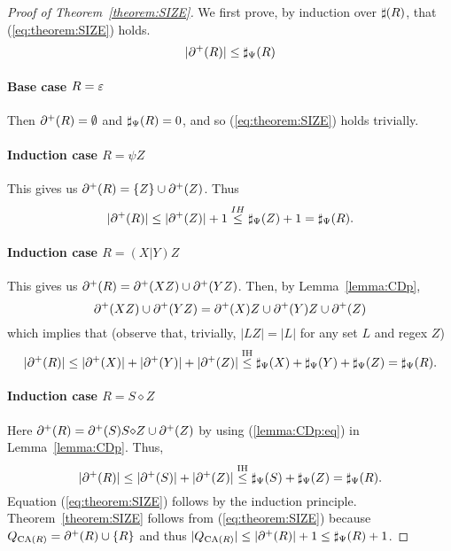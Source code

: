 \begin{proof}[Proof of Theorem~\ref{theorem:SIZE}]  
  We first prove, by induction over $\sharp(R)$, that (\ref{eq:theorem:SIZE}) holds.
  \begin {equation}
    \label{eq:theorem:SIZE}
  |\partial^{+}(R)|\leq \sharp_{\Psi}(R)
  \end{equation}
  
 \paragraph{Base case $R=\varepsilon$} Then $\partial^{+}(R) = \emptyset$ and
  $\sharp_{\Psi}(R)=0$, and so (\ref{eq:theorem:SIZE}) holds trivially.

 \paragraph{Induction case $R=\psi Z$} This gives us $\partial^{+}(R)=\{Z\}\cup\partial^{+}(Z)$.
  Thus
  \[
  |\partial^{+}(R)| \leq |\partial^{+}(Z)| + 1 \stackrel{IH}{\leq} \sharp_{\Psi}(Z) + 1 =
  \sharp_{\Psi}(R).
  \]


  \paragraph{Induction case $R=(X|Y)Z$} This gives us $\partial^{+}(R)=\partial^{+}(XZ)\cup\partial^{+}(YZ)$.
  Then, by Lemma~\ref{lemma:CDp},
  \[
  \partial^{+}(XZ)\cup\partial^{+}(YZ) = \partial^{+}(X)Z\cup\partial^{+}(Y)Z\cup\partial^{+}(Z)
  \]
  which implies that (observe that, trivially, $|LZ| = |L|$ for any set $L$ and regex $Z$)
  \[
  |\partial^{+}(R)| \leq |\partial^{+}(X)|+|\partial^{+}(Y)|+|\partial^{+}(Z)|
  \stackrel{\textrm{IH}}{\leq}
  \sharp_{\Psi}(X)+\sharp_{\Psi}(Y)+\sharp_{\Psi}(Z) = \sharp_{\Psi}(R).
  \]
  \paragraph{Induction case $R=S{\diamond}Z$} Here $\partial^{+}(R) = \partial^{+}(S)S{\diamond}Z \cup\partial^{+}(Z)$ by
  using (\ref{lemma:CDp:eq}) in Lemma~\ref{lemma:CDp}. Thus,
  \[
  |\partial^{+}(R)| \leq |\partial^{+}(S)| + |\partial^{+}(Z)| \stackrel{\textrm{IH}}{\leq}
  \sharp_{\Psi}(S)+\sharp_{\Psi}(Z) =  \sharp_{\Psi}(R).
  \]
  Equation (\ref{eq:theorem:SIZE}) follows by the induction principle.
  Theorem~\ref{theorem:SIZE} follows from (\ref{eq:theorem:SIZE}) because $Q_{\textrm{CA}(R)} = \partial^{+}(R) \cup\{R\}$ and thus
  $|Q_{\textrm{CA}(R)}| \leq |\partial^{+}(R)| + 1 \leq \sharp_{\Psi}(R)+1$.
\end{proof}

